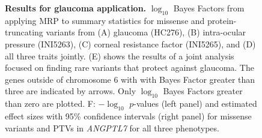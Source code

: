 
\begin{figure}[!h]
\caption{{\bf Results for glaucoma application.}
$\log_{10}$ Bayes Factors from applying MRP to summary statistics for missense and protein-truncating variants from (A) glaucoma (HC276), (B) intra-ocular pressure (INI5263), (C) corneal resistance factor (INI5265), and (D) all three traits jointly. (E) shows the results of a joint analysis focused on finding rare variants that protect against glaucoma. The genes outside of chromosome 6 with with Bayes Factor greater than three are indicated by arrows. Only $\log_{10}$ Bayes Factors greater than zero are plotted. F: $-\log_{10}$ $p$-values (left panel) and estimated effect sizes with 95\% confidence intervals (right panel) for missense variants and PTVs in \textit{ANGPTL7} for all three phenotypes.}
\label{fig3}
\end{figure}

